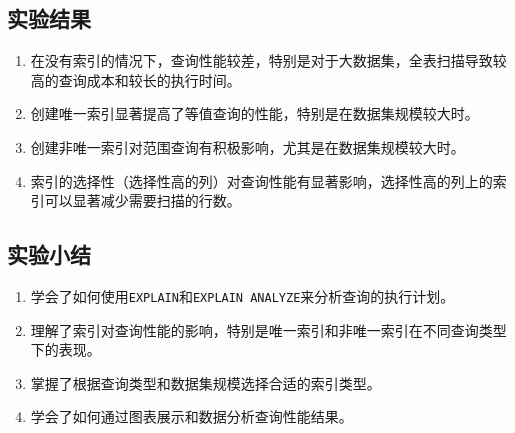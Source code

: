 \documentclass{article}
\begin{document}
	\subsection{实验结果}
	\begin{enumerate}
		\item 在没有索引的情况下，查询性能较差，特别是对于大数据集，全表扫描导致较高的查询成本和较长的执行时间。
		\item 创建唯一索引显著提高了等值查询的性能，特别是在数据集规模较大时。
		\item 创建非唯一索引对范围查询有积极影响，尤其是在数据集规模较大时。
		\item 索引的选择性（选择性高的列）对查询性能有显著影响，选择性高的列上的索引可以显著减少需要扫描的行数。
	\end{enumerate}
	
	\subsection{实验小结}
	\begin{enumerate}
		\item 学会了如何使用\texttt{EXPLAIN}和\texttt{EXPLAIN ANALYZE}来分析查询的执行计划。
		\item 理解了索引对查询性能的影响，特别是唯一索引和非唯一索引在不同查询类型下的表现。
		\item 掌握了根据查询类型和数据集规模选择合适的索引类型。
		\item 学会了如何通过图表展示和数据分析查询性能结果。
	\end{enumerate}
	
\end{document}
